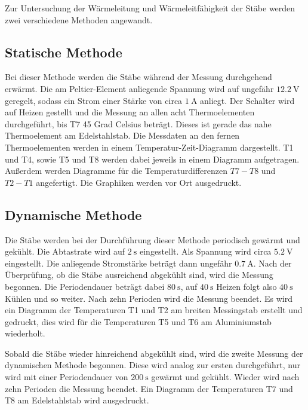 Zur Untersuchung der Wärmeleitung und Wärmeleitfähigkeit der Stäbe werden zwei
verschiedene Methoden angewandt.

\subsection{Statische Methode}
\label{sec:statische methode}
Bei dieser Methode werden die Stäbe während der Messung durchgehend erwärmt. Die
am Peltier-Element anliegende Spannung wird auf ungefähr $\SI{12.2}{\volt}$
geregelt, sodass ein Strom einer Stärke von circa $\SI{1}{\ampere}$ anliegt. Der Schalter wird
auf Heizen gestellt und die Messung an allen acht Thermoelementen durchgeführt, bis
T7 45 Grad Celsius beträgt. Dieses ist gerade das nahe Thermoelement am Edelstahlstab.
Die Messdaten an den fernen Thermoelementen werden in einem Temperatur-Zeit-Diagramm dargestellt.
T1 und T4, sowie T5 und T8 werden dabei jeweils in einem Diagramm aufgetragen.
Außerdem werden Diagramme für die Temperaturdifferenzen $T7 - T8$ und $T2 - T1$
angefertigt. Die Graphiken werden vor Ort ausgedruckt.

\subsection{Dynamische Methode}
\label{sec:dynamische methode}
Die Stäbe werden bei der Durchführung dieser Methode periodisch gewärmt und gekühlt.
Die Abtastrate wird auf $\SI{2}{\second}$ eingestellt. Als Spannung wird circa
$\SI{5.2}{\volt}$ eingestellt. Die anliegende Stromstärke beträgt dann ungefähr $\SI{0.7}{\ampere}$.
Nach der Überprüfung, ob die
Stäbe ausreichend abgekühlt sind, wird die Messung begonnen. Die Periodendauer beträgt
dabei $\SI{80}{\second}$, auf $\SI{40}{\second}$ Heizen folgt also $\SI{40}{\second}$ Kühlen
und so weiter. Nach zehn Perioden wird die Messung beendet. Es wird ein Diagramm
der Temperaturen T1 und T2 am breiten Messingstab erstellt und gedruckt, dies wird
für die Temperaturen T5 und T6 am Aluminiumstab wiederholt.

Sobald die Stäbe wieder hinreichend abgekühlt sind, wird die zweite Messung der
dynamischen Methode begonnen. Diese wird analog zur ersten durchgeführt, nur wird
mit einer Periodendauer von $\SI{200}{\second}$ gewärmt und gekühlt.
Wieder wird nach zehn Perioden die Messung beendet. Ein Diagramm der Temperaturen T7 und T8
am Edelstahlstab wird ausgedruckt.
